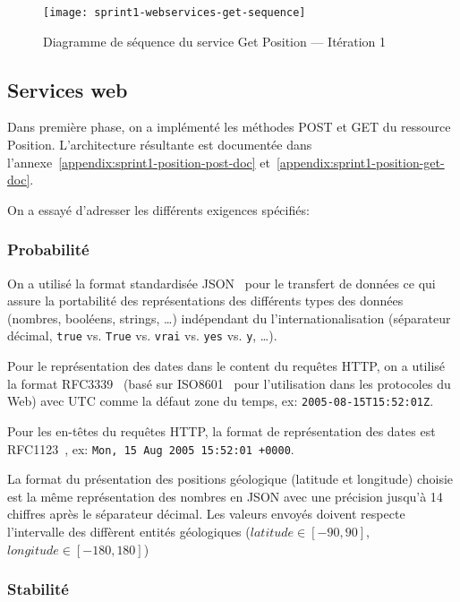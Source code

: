\begin{figure}[H]
    \centering
    \texttt{[image: sprint1-webservices-get-sequence]}
    \caption{Diagramme de séquence du service Get Position --- Itération 1}
\label{fig:sprint1-webservices-get-sequence}
\end{figure}

\subsection{Services web}

Dans première phase, on a implémenté les méthodes POST et GET du ressource
Position. L'architecture résultante est documentée dans
l'annexe~\ref{appendix:sprint1-position-post-doc}
et~\ref{appendix:sprint1-position-get-doc}.

On a essayé d'adresser les différents exigences spécifiés:

\subsubsection{Probabilité}

On a utilisé la format standardisée JSON~\cite{ECMA-404} pour le transfert de
données ce qui assure la portabilité des représentations des différents types
des données (nombres, booléens, strings, \ldots) indépendant du
l'internationalisation (séparateur décimal, \verb|true| vs. \verb|True| vs.
\verb|vrai| vs. \verb|yes| vs. \verb|y|, \ldots).

Pour le représentation des dates dans le content du requêtes HTTP, on a utilisé
la format RFC3339~\cite{RFC3339} (basé sur ISO8601~\cite{ISO8601} pour
l'utilisation dans les protocoles du Web) avec UTC comme la défaut zone du
temps, ex: \verb|2005-08-15T15:52:01Z|.

Pour les en-têtes du requêtes HTTP, la format de représentation des dates est
RFC1123~\cite{RFC1123}, ex: \verb|Mon, 15 Aug 2005 15:52:01 +0000|.

La format du présentation des positions géologique (latitude et longitude)
choisie est la même représentation des nombres en JSON avec une précision
jusqu'à 14 chiffres après le séparateur décimal. Les valeurs envoyés doivent
respecte l'intervalle des diffèrent entités géologiques ($latitude \in [-90,
90]$, $longitude \in [-180, 180]$)

\subsubsection{Stabilité}

